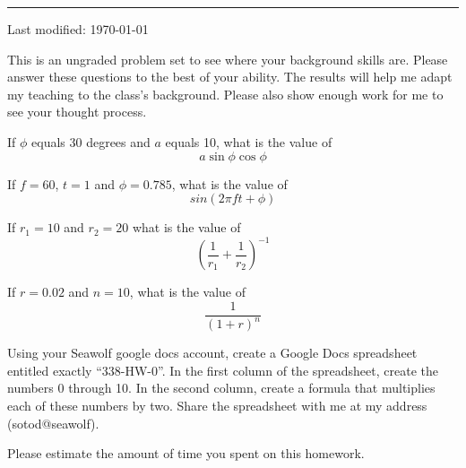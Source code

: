 \documentclass{article}
\begin{document}
\hrule
\vspace{10pt}

{\tiny Last modified: \today}

This is an ungraded problem set to see where your background skills are.
Please answer these questions to the best of your ability.  The results
will help me adapt my teaching to the class's background.  Please also
show enough work for me to see your thought process.


\problem{}

If $\phi$ equals 30 degrees and $a$ equals 10, what is the value of
$$ a\sin\phi\cos\phi $$


\problem{}

If $f = 60$, $t= 1$ and $\phi = 0.785$, what is the value of
$$ sin(2\pi f t + \phi) $$


\problem{}

If $r_1 = 10$ and $r_2 = 20$ what is the value of
$$ \left(\frac{1}{r_1} + \frac{1}{r_2}\right)^{-1} $$


\problem{}

If $r = 0.02$ and $n = 10$, what is the value of
$$ \frac{1}{(1 + r)^n} $$





Using your Seawolf google docs account, create a Google Docs
spreadsheet entitled exactly ``338-HW-0''.  In the first
column of the spreadsheet, create the numbers 0 through 10.  In the
second column, create a formula that multiplies each of these numbers by
two.  Share the spreadsheet with me at my address (sotod@seawolf).


Please estimate the amount of time you spent on this homework.
\end{document}
